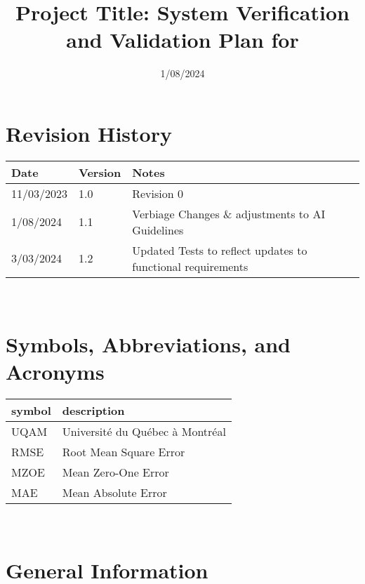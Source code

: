 \documentclass[12pt, titlepage]{article}
\begin{document}
\title{Project Title: System Verification and Validation Plan for \progname{}} 
\author{\authname}
\date{1/08/2024}
	
\maketitle


\section*{Revision History}

\begin{tabularx}{\textwidth}{p{3cm}p{2cm}X}
\toprule {\bf Date} & {\bf Version} & {\bf Notes}\\
\midrule
11/03/2023 & 1.0 & Revision 0\\
1/08/2024 & 1.1 & Verbiage Changes \& adjustments to AI Guidelines \\
3/03/2024 & 1.2 & Updated Tests to reflect updates to functional requirements \\
\bottomrule
\end{tabularx}

~\\

\newpage

\tableofcontents

\listoftables

\newpage

\section{Symbols, Abbreviations, and Acronyms}

\renewcommand{\arraystretch}{1.2}
\begin{tabular}{l l} 
  \toprule		
  \textbf{symbol} & \textbf{description}\\
  \midrule 
  UQAM & Université du Québec à Montréal\\
  RMSE & Root Mean Square Error\\
  MZOE & Mean Zero-One Error\\
  MAE & Mean Absolute Error\\
  \bottomrule
\end{tabular}\\

\newpage


\section{General Information}
\end{document}
